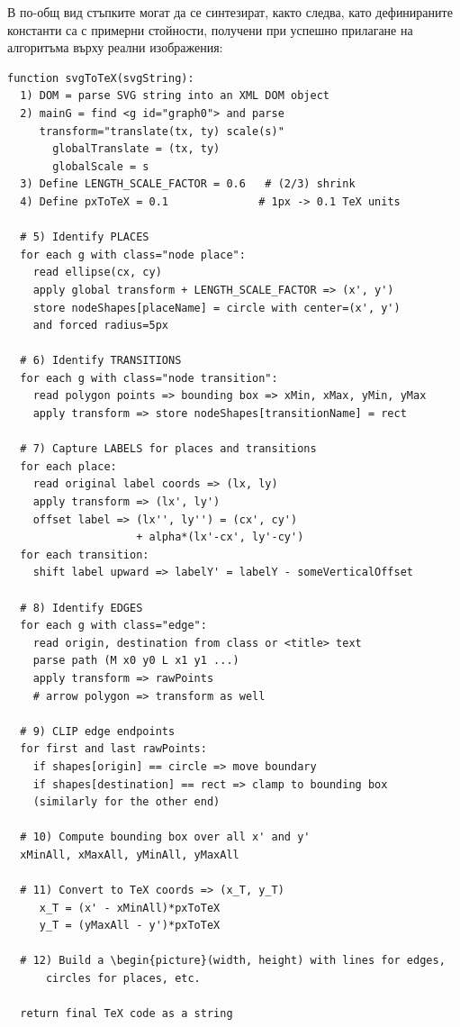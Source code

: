 \hspace*{2.5em}В по-общ вид стъпките могат да се синтезират, както следва, като дефинираните константи са с примерни стойности, получени при успешно прилагане на алгоритъма върху реални изображения:
\begin{verbatim}
function svgToTeX(svgString):
  1) DOM = parse SVG string into an XML DOM object
  2) mainG = find <g id="graph0"> and parse 
  	 transform="translate(tx, ty) scale(s)"
       globalTranslate = (tx, ty)
       globalScale = s
  3) Define LENGTH_SCALE_FACTOR = 0.6   # (2/3) shrink
  4) Define pxToTeX = 0.1              # 1px -> 0.1 TeX units

  # 5) Identify PLACES
  for each g with class="node place":
    read ellipse(cx, cy)
    apply global transform + LENGTH_SCALE_FACTOR => (x', y')
    store nodeShapes[placeName] = circle with center=(x', y') 
    and forced radius=5px

  # 6) Identify TRANSITIONS
  for each g with class="node transition":
    read polygon points => bounding box => xMin, xMax, yMin, yMax
    apply transform => store nodeShapes[transitionName] = rect

  # 7) Capture LABELS for places and transitions
  for each place:
    read original label coords => (lx, ly)
    apply transform => (lx', ly')
    offset label => (lx'', ly'') = (cx', cy') 
    				+ alpha*(lx'-cx', ly'-cy')
  for each transition:
    shift label upward => labelY' = labelY - someVerticalOffset

  # 8) Identify EDGES
  for each g with class="edge":
    read origin, destination from class or <title> text
    parse path (M x0 y0 L x1 y1 ...)
    apply transform => rawPoints
    # arrow polygon => transform as well

  # 9) CLIP edge endpoints
  for first and last rawPoints:
    if shapes[origin] == circle => move boundary
    if shapes[destination] == rect => clamp to bounding box
    (similarly for the other end)

  # 10) Compute bounding box over all x' and y'
  xMinAll, xMaxAll, yMinAll, yMaxAll

  # 11) Convert to TeX coords => (x_T, y_T)
     x_T = (x' - xMinAll)*pxToTeX
     y_T = (yMaxAll - y')*pxToTeX

  # 12) Build a \begin{picture}(width, height) with lines for edges,
      circles for places, etc.

  return final TeX code as a string
\end{verbatim}


